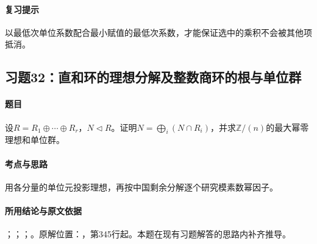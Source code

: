 \paragraph{复习提示}

以最低次单位系数配合最小赋值的最低次系数，才能保证选中的乘积不会被其他项抵消。



\subsection{习题32：直和环的理想分解及整数商环的根与单位群}

\label{ex:3:32}

\paragraph{题目}

设$R=R_1\oplus\cdots\oplus R_r$，$N\lhd R$。证明$N=\bigoplus_i(N\cap R_i)$，并求$\mathbb Z/(n)$的最大幂零理想和单位群。

\paragraph{考点与思路}

用各分量的单位元投影理想，再按中国剩余分解逐个研究模素数幂因子。

\paragraph{所用结论与原文依据}

；；；。原解位置：，第345行起。本题在现有习题解答的思路内补齐推导。


